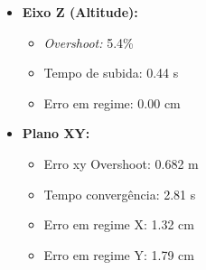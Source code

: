 \begin{itemize}
  \item \textbf{Eixo Z (Altitude):}
  \begin{itemize}
    \item \textit{Overshoot:} 5.4\%
    \item Tempo de subida: 0.44 s
    \item Erro em regime: 0.00 cm
  \end{itemize}
  \item \textbf{Plano XY:}
  \begin{itemize}
    \item Erro xy Overshoot: 0.682 m
    \item Tempo convergência: 2.81 s
    \item Erro em regime X: 1.32 cm
    \item Erro em regime Y: 1.79 cm
  \end{itemize}
\end{itemize}
